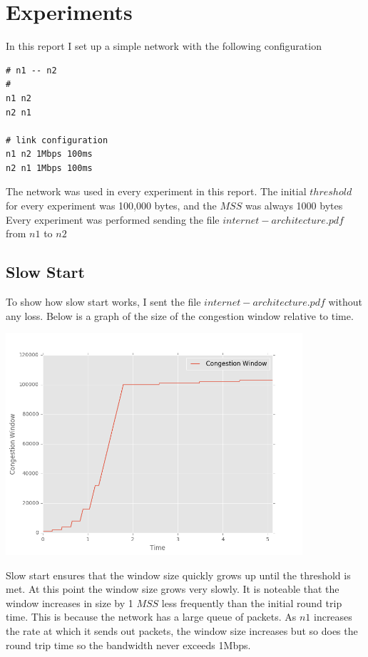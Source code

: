 \documentclass[fleqn,11pt]{article}
\begin{document}
\section{Experiments}

In this report I set up a simple network with the following configuration
\begin{lstlisting}[title={Network Configuration for Experiments}]
# n1 -- n2
#
n1 n2
n2 n1

# link configuration
n1 n2 1Mbps 100ms
n2 n1 1Mbps 100ms
\end{lstlisting}
The network was used in every experiment in this report. 
The initial $threshold$ for every experiment was 100,000 bytes, and the $MSS$ was always 1000 bytes
Every experiment was performed sending the file $internet-architecture.pdf$ from $n1$ to $n2$


\subsection{Slow Start}

To show how slow start works, I sent the file $internet-architecture.pdf$ without any loss.
Below is a graph of the size of the congestion window relative to time.

\includegraphics[width=11cm]{graphs/cwndbasic.png}

Slow start ensures that the window size quickly grows up until the threshold is met. 
At this point the window size grows very slowly. It is noteable that the window increases in size by 1 $MSS$ less frequently than the initial round trip time.
This is because the network has a large queue of packets. 
As $n1$ increases the rate at which it sends out packets, the window size increases but so does the round trip time so the bandwidth never exceeds 1Mbps.
\end{document}
